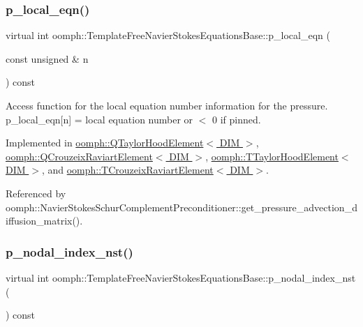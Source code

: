 \subsubsection{\texorpdfstring{p\+\_\+local\+\_\+eqn()}{p\_local\_eqn()}}
{\footnotesize\ttfamily virtual int oomph\+::\+Template\+Free\+Navier\+Stokes\+Equations\+Base\+::p\+\_\+local\+\_\+eqn (\begin{DoxyParamCaption}\item[{const unsigned \&}]{n }\end{DoxyParamCaption}) const\hspace{0.3cm}{\ttfamily [pure virtual]}}



Access function for the local equation number information for the pressure. p\+\_\+local\+\_\+eqn\mbox{[}n\mbox{]} = local equation number or $<$ 0 if pinned. 



Implemented in \hyperlink{classoomph_1_1QTaylorHoodElement_a13d4dd087330f26ee6283fe63153867d}{oomph\+::\+Q\+Taylor\+Hood\+Element$<$ D\+I\+M $>$}, \hyperlink{classoomph_1_1QCrouzeixRaviartElement_a230286c5b2cb5532e649d392c408dad5}{oomph\+::\+Q\+Crouzeix\+Raviart\+Element$<$ D\+I\+M $>$}, \hyperlink{classoomph_1_1TTaylorHoodElement_adb29767b15234d632c11991a4f9a3911}{oomph\+::\+T\+Taylor\+Hood\+Element$<$ D\+I\+M $>$}, and \hyperlink{classoomph_1_1TCrouzeixRaviartElement_abe36d468c62f8098a62d74be8dd553b3}{oomph\+::\+T\+Crouzeix\+Raviart\+Element$<$ D\+I\+M $>$}.



Referenced by oomph\+::\+Navier\+Stokes\+Schur\+Complement\+Preconditioner\+::get\+\_\+pressure\+\_\+advection\+\_\+diffusion\+\_\+matrix().

\mbox{\label{classoomph_1_1TemplateFreeNavierStokesEquationsBase_a58c5bba4a2cef9dc6cb0835104ef1c06}} 
\subsubsection{\texorpdfstring{p\+\_\+nodal\+\_\+index\+\_\+nst()}{p\_nodal\_index\_nst()}}
{\footnotesize\ttfamily virtual int oomph\+::\+Template\+Free\+Navier\+Stokes\+Equations\+Base\+::p\+\_\+nodal\+\_\+index\+\_\+nst (\begin{DoxyParamCaption}{ }\end{DoxyParamCaption}) const\hspace{0.3cm}{\ttfamily [pure virtual]}}



